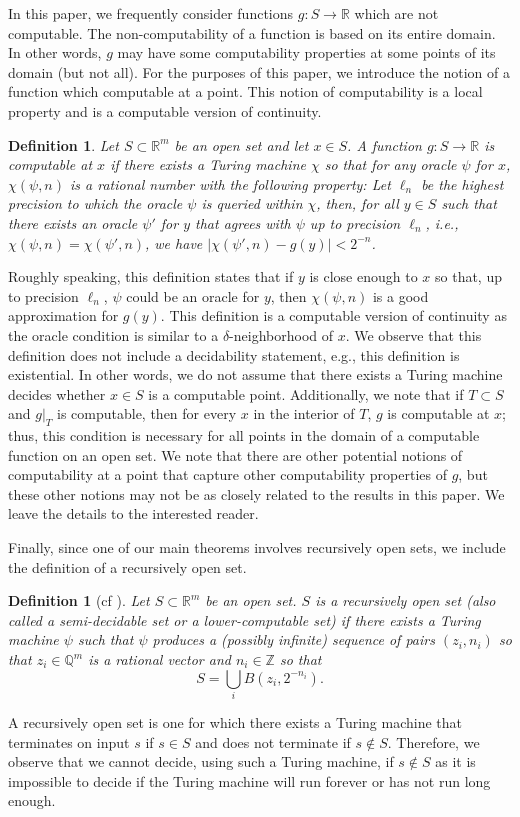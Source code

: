\documentclass[11pt, reqno]{amsart}
\newtheorem{definition}[theorem]{Definition}
\newcommand{\bR}{{\mathbb R}}
\newcommand{\bZ}{{\mathbb Z}}
\newcommand{\bQ}{{\mathbb Q}}
\begin{document}
In this paper, we frequently consider functions $g:S\rightarrow\bR$ which are not computable.  The non-computability of a function is based on its entire domain.  In other words, $g$ may have some computability properties at some points of its domain (but not all).  For the purposes of this paper, we introduce the notion of a function which computable at a point.  This notion of computability is a local property and is a computable version of continuity.

\begin{definition}
Let $S\subset\bR^m$ be an open set and let $x\in S$.  A function $g:S\rightarrow\bR$ is {\em computable at $x$} if there exists a Turing machine $\chi$ so that for any oracle $\psi$ for $x$, $\chi(\psi,n)$ is a rational number with the following property: Let $\ell_n$ be the highest precision to which the oracle $\psi$ is queried within $\chi$, then, for all $y\in S$ such that there exists an oracle $\psi'$ for $y$ that agrees with $\psi$ up to precision $\ell_n$, i.e., $\chi(\psi,n)=\chi(\psi',n)$, we have $|\chi(\psi',n)-g(y)|<2^{-n}$.
\end{definition}

Roughly speaking, this definition states that if $y$ is close enough to $x$ so that, up to precision $\ell_n$, $\psi$ could be an oracle for $y$, then $\chi(\psi,n)$ is a good approximation for $g(y)$.  This definition is a computable version of continuity as the oracle condition is similar to a $\delta$-neighborhood of $x$.  We observe that this definition does not include a decidability statement, e.g., this definition is existential.  In other words, we do not assume that there exists a Turing machine decides whether $x\in S$ is a computable point.  Additionally, we note that if $T\subset S$ and $g|_T$ is computable, then for every $x$ in the interior of $T$, $g$ is computable at $x$; thus, this condition is necessary for all points in the domain of a computable function on an open set.  We note that there are other potential notions of computability at a point that capture other computability properties of $g$, but these other notions may not be as closely related to the results in this paper.  We leave the details to the interested reader.

Finally, since one of our main theorems involves recursively open sets, we include the definition of a recursively open set.
\begin{definition}[{cf \cite[Definition 2.4]{GHR}}]
Let $S\subset\bR^m$ be an open set.  $S$ is a {\em recursively open set} (also called a semi-decidable set or a lower-computable set) if there exists a Turing machine $\psi$ such that $\psi$ produces a (possibly infinite) sequence of pairs $(z_i,n_i)$ so that $z_i\in\bQ^m$ is a rational vector and $n_i\in\bZ$ so that
$$
S=\bigcup_i B\left(z_i,2^{-n_i}\right).
$$
\end{definition}
A recursively open set is one for which there exists a Turing machine that terminates on input $s$ if $s\in S$ and does not terminate if $s\not\in S$.  Therefore, we observe that we cannot decide, using such a Turing machine, if $s\not\in S$ as it is impossible to decide if the Turing machine will run forever or has not run long enough.
\end{document}
